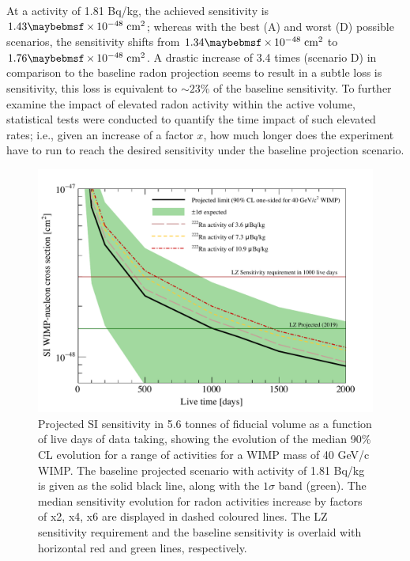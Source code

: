 {\begin{figure}[H!]
    \label{fig:radon_vs_sensitivity}
\end{figure}
%

At a \RnTTT{} activity of 1.81 \micro{}Bq/kg, the achieved sensitivity is $1.43 \times 10^{-48} \; \MathText{cm}^2$; whereas with the best (A) and worst (D) possible scenarios, the sensitivity shifts from $1.34 \times 10^{-48} \; \MathText{cm}^2$ to $1.76 \times 10^{-48} \; \MathText{cm}^2$. A drastic increase of 3.4 times (scenario D) in comparison to the baseline radon projection seems to result in a subtle loss is sensitivity, this loss is equivalent to $\sim23\%$ of the baseline sensitivity. To further examine the impact of elevated radon activity within the active volume, statistical tests were conducted to quantify the time impact of such elevated rates; i.e., given an increase of a factor $x$, how much longer does the experiment have to run to reach the desired sensitivity under the baseline projection scenario. 

%
\begin{figure}[H!]
    \centering
    \includegraphics[scale=0.8]{Chapter_5/Figures/sensitivity_studies/sensitivity_vs_time_radon.pdf}
    \caption[Projected SI sensitivity in 5.6 tonnes of fiducial volume as a function of live days of data taking, showing the evolution of the median 90\% CL evolution for a range of \RnTTT{} activities for a WIMP mass of 40 GeV/c\squared{} WIMP.]%
    {Projected SI sensitivity in 5.6 tonnes of fiducial volume as a function of live days of data taking, showing the evolution of the median 90\% CL evolution for a range of \RnTTT{} activities for a WIMP mass of 40 GeV/c\squared{} WIMP. The baseline projected scenario with \RnTTT{} activity of 1.81 \micro{}Bq/kg is given as the solid black line, along with the $1\sigma$ band (green). The median sensitivity evolution for radon activities increase by factors of x2, x4, x6 are displayed in dashed coloured lines. The LZ sensitivity requirement and the baseline sensitivity is overlaid with horizontal red and green lines, respectively.}
    \label{fig:radon_vs_time}
\end{figure}
%

}
